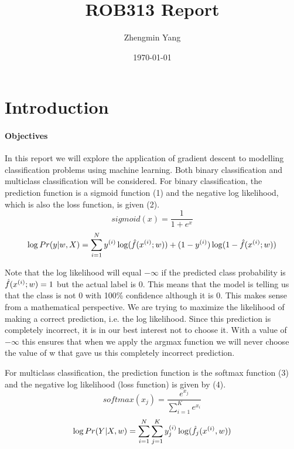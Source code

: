 \documentclass[11pt,letterpaper,titlepage]{article}
\title{ROB313 Report}
\author{Zhengmin Yang}
\date{\today}
\begin{document}
	\maketitle
	
	\section{Introduction}
	\paragraph{Objectives}
	In this report we will explore the application of gradient descent to modelling classification problems using machine learning. Both binary classification and multiclass classification will be considered. For binary classification, the prediction function is a sigmoid function (1) and the negative log likelihood, which is also the loss function, is given (2).
	\begin{equation}
	sigmoid(x)=\frac{1}{1+e^{x}}
	\end{equation}
	\begin{equation}
	\log Pr(\boldmath y \unboldmath | \boldmath w \unboldmath, \boldmath X \unboldmath)  = \sum_{i=1}^{N} y^{(i)}\log(\hat{f}(\boldmath x^{(i)}\unboldmath; \boldmath w \unboldmath)) + (1-y^{(i)})\log (1-\hat{f}(\boldmath x^{(i)} \unboldmath; \boldmath w \unboldmath))
	\end{equation}
	
	Note that the log likelihood will equal $-\infty$ if the predicted class probability is $\hat{f}(\boldmath x^{(i)}; \boldmath w) = 1$ but the actual label is 0. This means that the model is telling us that the class is not 0 with 100\% confidence although it is 0. This makes sense from a mathematical perspective. We are trying to maximize the likelihood of making a correct prediction, i.e. the log likelihood. Since this prediction is completely incorrect, it is in our best interest not to choose it. With a value of $- \infty$ this ensures that when we apply the argmax function we will never choose the value of w that gave us this completely incorrect prediction.
	
	For multiclass classification, the prediction function is the softmax function (3) and the negative log likelihood (loss function) is given by (4).
	\begin{equation}
	softmax(x_{j})=\frac{e^{x_{j}}}{\sum_{i=1}^{K}e^{x_{i}}}
	\end{equation}
	\begin{equation}
	\log Pr(\boldmath Y \unboldmath | \boldmath X \unboldmath, \boldmath w \unboldmath) = \sum_{i=1}^{N} \sum_{j=1}^{K}  y_{j}^{(i)}\log(\hat{f_{j}}(\boldmath x^{(i)} \unboldmath,\boldmath w \unboldmath))
	\end{equation}
	
\end{document}
